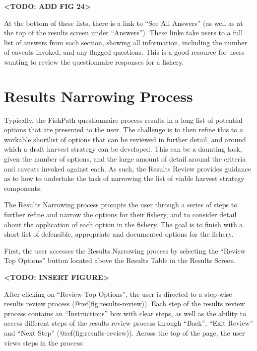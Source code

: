\documentclass[11pt,]{book}
\begin{document}
\textbf{\textless TODO: ADD FIG 24\textgreater{}}

At the bottom of these lists, there is a link to ``See All Answers'' (as
well as at the top of the results screen under ``Answers''). These links
take users to a full list of answers from each section, showing all
information, including the number of caveats invoked, and any flagged
questions. This is a good resource for users wanting to review the
questionnaire responses for a fishery.

\hypertarget{results-narrowing-process}{%
\section{Results Narrowing Process}\label{results-narrowing-process}}

Typically, the FishPath questionnaire process results in a long list of
potential options that are presented to the user. The challenge is to
then refine this to a workable shortlist of options that can be reviewed
in further detail, and around which a draft harvest strategy can be
developed. This can be a daunting task, given the number of options, and
the large amount of detail around the criteria and caveats invoked
against each. As such, the Results Review provides guidance as to how to
undertake the task of narrowing the list of viable harvest strategy
components.

The Results Narrowing process prompts the user through a series of steps
to further refine and narrow the options for their fishery, and to
consider detail about the application of each option in the fishery. The
goal is to finish with a short list of defensible, appropriate and
documented options for the fishery.

First, the user accesses the Results Narrowing process by selecting the
``Review Top Options'' button located above the Results Table in the
Results Screen.

\textbf{\textless TODO: INSERT FIGURE\textgreater{}}

After clicking on ``Review Top Options'', the user is directed to a
step-wise results review process (@ref(fig:results-review)). Each step
of the results review process contains an ``Instructions'' box with
clear steps, as well as the ability to access different steps of the
results review process through ``Back'', ``Exit Review'' and ``Next
Step'' (@ref(fig:results-review)). Across the top of the page, the user
views steps in the process:
\end{document}
